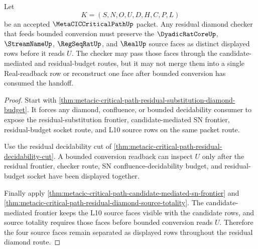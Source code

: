 \begin{theorem}
\label{thm:metacic-critical-path-residual-diamond-l10-source-separation}
Let
$$
K=(S,N,O,U,D,H,C,P,L)
$$
be an accepted $\MetaCICCriticalPathUp$ packet. Any residual diamond checker that feeds bounded conversion must preserve the $\DyadicRatCoreUp$, $\StreamNameUp$, $\RegSeqRatUp$, and $\RealUp$ source faces as distinct displayed rows before it reads $U$. The checker may pass those faces through the candidate-mediated and residual-budget routes, but it may not merge them into a single Real-readback row or reconstruct one face after bounded conversion has consumed the handoff.
\end{theorem}
\begin{proof}
Start with \autoref{thm:metacic-critical-path-residual-substitution-diamond-budget}. It forces any diamond, confluence, or bounded decidability consumer to expose the residual-substitution frontier, candidate-mediated SN frontier, residual-budget socket route, and L10 source rows on the same packet route.

Use the residual decidability cut of \autoref{thm:metacic-critical-path-residual-decidability-cut}. A bounded conversion readback can inspect $U$ only after the residual frontier, checker route, SN confluence-decidability budget, and residual-budget socket have been displayed together.

Finally apply \autoref{thm:metacic-critical-path-candidate-mediated-sn-frontier} and \autoref{thm:metacic-critical-path-residual-diamond-source-totality}. The candidate-mediated frontier keeps the L10 source faces visible with the candidate rows, and source totality requires those faces before bounded conversion reads $U$. Therefore the four source faces remain separated as displayed rows throughout the residual diamond route.
\end{proof}

